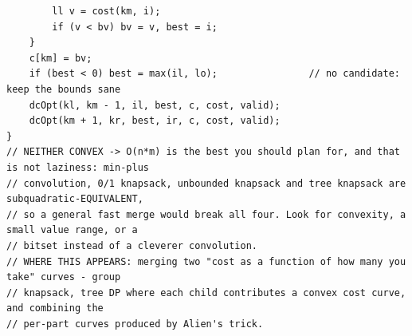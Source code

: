 \documentclass[9pt,a4paper,twocolumn]{extarticle}
\begin{document}
\begin{lstlisting}
        ll v = cost(km, i);
        if (v < bv) bv = v, best = i;
    }
    c[km] = bv;
    if (best < 0) best = max(il, lo);                // no candidate: keep the bounds sane
    dcOpt(kl, km - 1, il, best, c, cost, valid);
    dcOpt(km + 1, kr, best, ir, c, cost, valid);
}
// NEITHER CONVEX -> O(n*m) is the best you should plan for, and that is not laziness: min-plus
// convolution, 0/1 knapsack, unbounded knapsack and tree knapsack are subquadratic-EQUIVALENT,
// so a general fast merge would break all four. Look for convexity, a small value range, or a
// bitset instead of a cleverer convolution.
// WHERE THIS APPEARS: merging two "cost as a function of how many you take" curves - group
// knapsack, tree DP where each child contributes a convex cost curve, and combining the
// per-part curves produced by Alien's trick.
\end{lstlisting}

\filbreak
\end{document}
